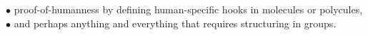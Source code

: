 \documentclass[a4paper,10pt]{article}
\begin{document}
\begin{flushleft}
{{		\hspace*{0.2in}$\bullet$ proof-of-humanness by defining human-specific hooks in molecules or polycules,\linebreak\linebreak
		\hspace*{0.2in}$\bullet$ and perhaps anything and everything that requires structuring in groups.\linebreak\linebreak\linebreak
		\textbf{\Large{}}\linebreak\linebreak
	}}
\end{flushleft}
\begin{multicols}{2}
	
	
\end{multicols}
\end{document}
